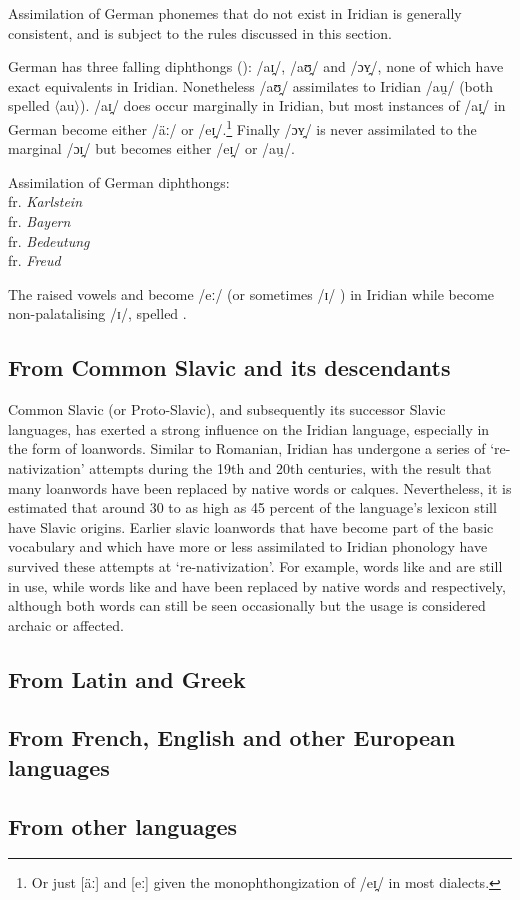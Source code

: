 Assimilation of German phonemes that do not exist in Iridian is generally consistent, and is subject to the rules discussed in this section.

German has three falling diphthongs (\cite{wiese1996}): /aɪ̯/, /aʊ̯/ and /ɔʏ̯/, none of which have exact equivalents in Iridian. Nonetheless /aʊ̯/ assimilates to Iridian /au̯/ (both spelled $\langle$au$\rangle$). /aɪ̯/ does occur marginally in Iridian, but most instances of /aɪ̯/ in German become either /äː/ or /eɪ̯/.\footnote{Or just [äː] and [eː] given the monophthongization of /eɪ̯/ in most dialects.} Finally /ɔʏ̯/ is never assimilated to the marginal /ɔɪ̯/ but becomes either /eɪ̯/ or /au̯/.


\ex
Assimilation of German diphthongs:\\
 fr. \emph{Karlstein}\\
 fr. \emph{Bayern}\\
 fr. \emph{Bedeutung}\\
 fr. \emph{Freud}
\xe

The raised vowels  and  become /eː/  (or sometimes /ɪ/
) in Iridian while  become non-palatalising /ɪ/, spelled
.


\subsection{From Common Slavic and its descendants}

Common Slavic (or Proto-Slavic), and subsequently its successor Slavic
languages, has exerted a strong influence on the Iridian language, especially in
the form of loanwords. Similar to Romanian, Iridian has undergone a series of
`re-nativization' attempts during the 19th and 20th centuries, with the result
that many loanwords have been replaced by native words or calques. Nevertheless,
it is estimated that around 30 to as high as 45 percent of the language's
lexicon still have Slavic origins. Earlier slavic loanwords that have become
part of the basic vocabulary and which have more or less assimilated to Iridian
phonology have survived these attempts at `re-nativization'. For example, words
like  and  are still in use, while words
like  and  have been replaced by native
words  and  respectively, although both words can still
be seen occasionally but the usage is considered archaic or affected.



\subsection{From Latin and Greek}

\subsection{From French, English and other European languages}

\subsection{From other languages}